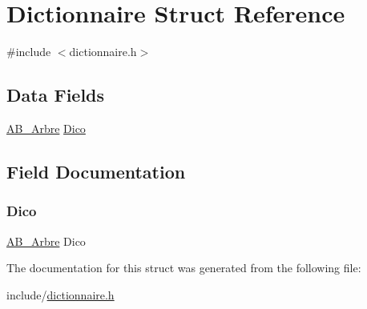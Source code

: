 \hypertarget{struct_dictionnaire}{}\section{Dictionnaire Struct Reference}
\label{struct_dictionnaire}


{\ttfamily \#include $<$dictionnaire.\+h$>$}

\subsection*{Data Fields}
\begin{DoxyCompactItemize}
\item 
\hyperlink{struct_a_b___arbre}{A\+B\+\_\+\+Arbre} \hyperlink{struct_dictionnaire_a8deca033ebac62d6a14543ab7489ead2}{Dico}
\end{DoxyCompactItemize}


\subsection{Field Documentation}
\mbox{\label{struct_dictionnaire_a8deca033ebac62d6a14543ab7489ead2}} 
\subsubsection{\texorpdfstring{Dico}{Dico}}
{\footnotesize\ttfamily \hyperlink{struct_a_b___arbre}{A\+B\+\_\+\+Arbre} Dico}



The documentation for this struct was generated from the following file\+:\begin{DoxyCompactItemize}
\item 
include/\hyperlink{dictionnaire_8h}{dictionnaire.\+h}\end{DoxyCompactItemize}
